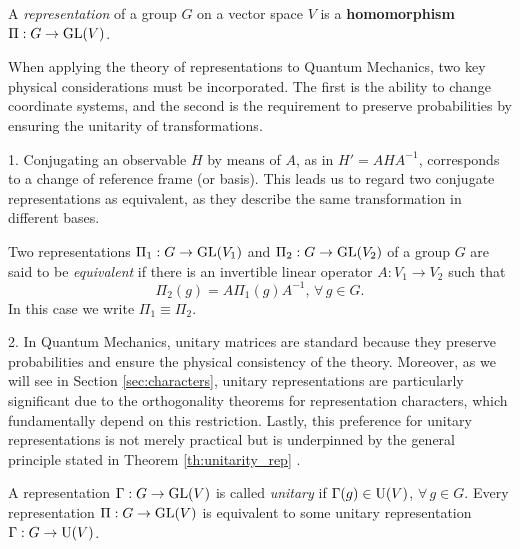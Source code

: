 \begin{definition} \label{def:representation}
A \textit{representation} of a group $G$ on a vector space $V$ is a \textbf{homomorphism} $\Pi: G \to {\text{GL}}(V)$.
\end{definition}

When applying the theory of representations to Quantum Mechanics, two key physical considerations must be incorporated. The first is the ability to change coordinate systems, and the second is the requirement to preserve probabilities by ensuring the unitarity of transformations.

\n

1. Conjugating an observable $H$ by means of $A$, as in $H' = A H A^{-1}$, corresponds to a change of reference frame (or basis). This leads us to regard two conjugate representations as equivalent, as they describe the same transformation in different bases.

\begin{definition} \label{def:equiv_representations}
Two representations $\Pi_1: G \to {\text{GL}}(V_1)$ and $\Pi_2: G \to {\text{GL}}(V_2)$ of a group $G$ are said to be \textit{equivalent} if there is an invertible linear operator $A: V_1 \to V_2$ such that
\begin{equation} \label{eq:intertwiner}
\Pi_2(g) = A \Pi_1(g) A^{-1}, \, \forall \, g \in G.
\end{equation}
In this case we write $\Pi_1 \equiv \Pi_2$.
\end{definition}

2. In Quantum Mechanics, unitary matrices are standard because they preserve probabilities and ensure the physical consistency of the theory. Moreover, as we will see in Section \ref{sec:characters}, unitary representations are particularly significant due to the orthogonality theorems for representation characters, which fundamentally depend on this restriction. Lastly, this preference for unitary representations is not merely practical but is underpinned by the general principle stated in Theorem \ref{th:unitarity_rep} \cite{dresselhaus}.

\begin{theorem} \label{th:unitarity_rep}
A representation $\Gamma: G \to {\text{GL}}(V)$ is called \textit{unitary} if $\Gamma(g) \in {\text{U}}(V)$, $\forall \, g \in G$. Every representation $\Pi: G \to {\text{GL}}(V)$ is equivalent to some unitary representation $\Gamma: G \to {\text{U}}(V)$.
\end{theorem}

